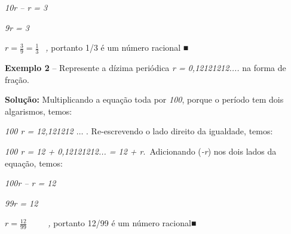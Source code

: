 \documentclass[12pt]{article}
\renewcommand{\_}{\kern-1.5pt\textunderscore\kern-1.5pt}
\begin{document}
\begin{adjustwidth}{0.69in}{0.0in}
\begin{justify}
\tab \textit{10r – r = 3}
\end{justify}\par

\end{adjustwidth}

\begin{adjustwidth}{0.69in}{0.0in}
\begin{justify}
\tab \textit{9r = 3}
\end{justify}\par

\end{adjustwidth}

\begin{adjustwidth}{0.69in}{0.0in}
\begin{justify}
\tab  \( r=\frac{3}{9}=\frac{1}{3}~~ \) \textit{, }portanto 1/3 é um número racional\textit{ ■}
\end{justify}\par

\end{adjustwidth}

\tab 
\vspace{\baselineskip}\begin{justify}
\textbf{Exemplo 2} – Represente a dízima periódica \textit{r = 0,12121212....} na forma de fração.
\end{justify}\par

\begin{justify}
\textbf{Solução: }Multiplicando a equação toda por \textit{100}, porque o período tem dois algarismos, temos:
\end{justify}\par

\tab \tab 
\vspace{\baselineskip}\tab \textit{100 r = 12,121212 $ \ldots $ } . Re-escrevendo o lado direito da igualdade, temos:\tab \par

\tab \textit{100 r = 12 + 0,12121212... = 12 + r}.\  Adicionando (\textit{-r}) nos dois lados da equação, temos:\par

\tab \textit{100r – r = 12}\par

\textit{\tab 99r = 12}\par

\tab  \( r=\frac{12}{99}~~~ \) \textit{\ \ \  ,} portanto 12/99 é um número racional\textit{■}\par
\end{document}

